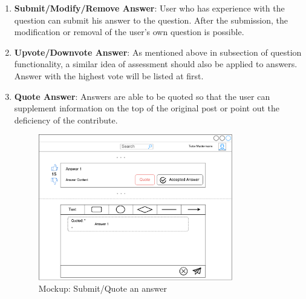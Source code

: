 \begin{enumerate}
\item
\textbf{Submit/Modify/Remove Answer}: User who has experience with the question can submit his answer to the question. After the submission, the modification or removal of the user's own question is possible.


\item
\textbf{Upvote/Downvote Answer}: As mentioned above in subsection of question functionality, a similar idea of assessment should also be applied to answers. Answer with the highest vote will be listed at first.


\item
\textbf{Quote Answer}: Answers are able to be quoted so that the user can supplement information on the top of the original post or point out the deficiency of the contribute.

\begin{figure}[!htbp]
  \centering
    \includegraphics[width=0.8\textwidth]{Figures/mockup/quote.pdf}
  \caption{Mockup: Submit/Quote an answer}
\end{figure}

\end{enumerate}


